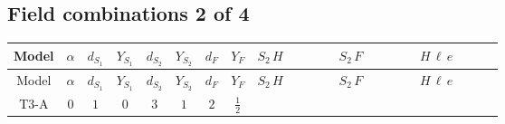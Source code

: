 \documentclass[8pt]{article}
\begin{document}
\begin{landscape}
\subsection*{Field combinations 2 of 4}
\begin{longtable}{@{}cccccccc >{\raggedright\arraybackslash}p{0.21\linewidth} >{\raggedright\arraybackslash}p{0.21\linewidth} >{\raggedright\arraybackslash}p{0.21\linewidth}@{}}
\toprule
Model & $\alpha$ & $d_{S_1}$ & $Y_{S_1}$ & $d_{S_2}$ & $Y_{S_2}$ & $d_F$ & $Y_F$ & $S_2\,H$ & $S_2\,F$ & $H\,\ell\,e$ \\
\midrule
\endfirsthead
\toprule
Model & $\alpha$ & $d_{S_1}$ & $Y_{S_1}$ & $d_{S_2}$ & $Y_{S_2}$ & $d_F$ & $Y_F$ & $S_2\,H$ & $S_2\,F$ & $H\,\ell\,e$ \\
\midrule
\endhead
T3-A & $0$ & $1$ & $0$ & $3$ & $1$ & $2$ & $\frac{1}{2}$ & \scriptsize\adjustbox{max width=\linewidth}{$\begin{gathered} -\frac{2 \hbar  \overline{y_{2,i_1,r_1}} \overline{Y_{e,i_2,i_3}} H_{a_1} S_{2,j_1} y_{2,i_2,r_1} Y_{e,i_1,i_3} H_{a_1}{}^{\dagger } S_{2,j_1}{}^{\dagger }}{\sqrt{3} \epsilon } \\ -\frac{2 \hbar  \overline{y_{2,i_1,r_1}} \overline{Y_{e,i_2,i_3}} H_{a_1} S_{2,j_1} y_{2,i_2,r_1} Y_{e,i_1,i_3} H_{a_1}{}^{\dagger } S_{2,j_1}{}^{\dagger }}{\sqrt{3}} \\ +\frac{2 i \sqrt{\frac{2}{3}} \hbar  \overline{y_{2,i_1,r_1}} \overline{Y_{e,i_2,i_3}} H_{a_2} S_{2,j_2} y_{2,i_2,r_1} Y_{e,i_1,i_3} H_{a_1}{}^{\dagger } S_{2,j_1}{}^{\dagger } \mathcal{I}_{H2,a_1,a_2,j_2,j_1}{}^1}{\epsilon }\end{gathered}$} & \scriptsize\adjustbox{max width=\linewidth}{$\begin{gathered} +\frac{2}{3} \hbar  \log \left(\frac{\bar{\mu}^{2}}{M_F^2}\right) \overline{y_{2,i_1,r_1}} \overline{y_{2,i_2,r_2}} S_{2,j_2}^2 y_{2,i_1,r_2} y_{2,i_2,r_1} \left(S_{2,j_1}{}^{\dagger }\right){}^2 \\ -\frac{2 C_{S_2^\dagger S_2} \hbar  \log \left(\frac{\bar{\mu}^{2}}{M_F^2}\right) \overline{y_{2,i_1,r_1}} S_{2,j_1} y_{2,i_1,r_1} S_{2,j_1}{}^{\dagger }}{\sqrt{3}} \\ -\frac{4}{3} \hbar  \log \left(\frac{\bar{\mu}^{2}}{M_F^2}\right) \overline{y_{2,i_1,r_1}} \overline{y_{2,i_2,r_2}} S_{2,j_1} S_{2,j_2} y_{2,i_1,r_2} y_{2,i_2,r_1} S_{2,j_1}{}^{\dagger } S_{2,j_2}{}^{\dagger }\end{gathered}$} & \scriptsize\adjustbox{max width=\linewidth}{$\begin{gathered} +\frac{\hbar  \overline{y_{1,i_3,r_1}} \overline{L_{a_1,i_2}}\, P_R\, e_{i_1} H_{a_1} y_{1,i_2,r_1} Y_{e,i_3,i_1}}{4 \epsilon } \\ +\frac{3}{8} \hbar  \overline{y_{1,i_3,r_1}} \overline{L_{a_1,i_2}}\, P_R\, e_{i_1} H_{a_1} y_{1,i_2,r_1} Y_{e,i_3,i_1} \\ +\frac{\sqrt{3} \hbar  \overline{y_{2,i_3,r_1}} \overline{L_{a_1,i_2}}\, P_R\, e_{i_1} H_{a_1} y_{2,i_2,r_1} Y_{e,i_3,i_1}}{4 \epsilon }\end{gathered}$} \\

\end{longtable}
\end{landscape}
\end{document}
